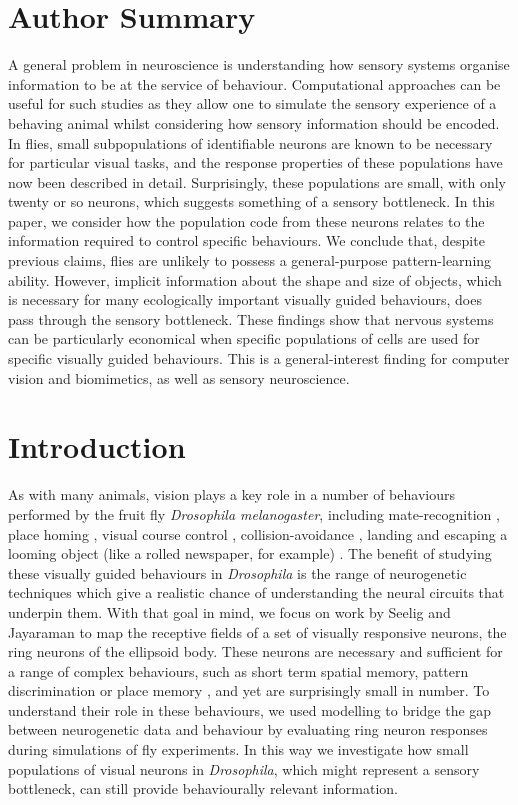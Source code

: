 \section*{Author Summary}
A general problem in neuroscience is understanding how sensory systems organise information to be at the service of behaviour. Computational approaches can be useful for such studies as they allow one to simulate the sensory experience of a behaving animal whilst considering how sensory information should be encoded. In flies, small subpopulations of identifiable neurons are known to be necessary for particular visual tasks, and the response properties of these populations have now been described in detail. Surprisingly, these populations are small, with only twenty or so neurons, which suggests something of a sensory bottleneck. In this paper, we consider how the population code from these neurons relates to the information required to control specific behaviours. We conclude that, despite previous claims, flies are unlikely to possess a general-purpose pattern-learning ability. However, implicit information about the shape and size of objects, which is necessary for many ecologically important visually guided behaviours, does pass through the sensory bottleneck. These findings show that nervous systems can be particularly economical when specific populations of cells are used for specific visually guided behaviours. This is a general-interest finding for computer vision and biomimetics, as well as sensory neuroscience.

\section*{Introduction}
As with many animals, vision plays a key role in a number of behaviours performed by the fruit fly \emph{Drosophila melanogaster}, including mate-recognition \cite{Agrawal2014}, place homing \cite{Ofstad2011}, visual course control \cite{Borst2014}, collision-avoidance \cite{Tammero2002}, landing \cite{Tammero2002} and escaping a looming object (like a rolled newspaper, for example) \cite{Card2008}. The benefit of studying these visually guided behaviours in \emph{Drosophila} is the range of neurogenetic techniques which give a realistic chance of understanding the neural circuits that underpin them. With that goal in mind, we focus on work by Seelig and Jayaraman \cite{Seelig2013} to map the receptive fields of a set of visually responsive neurons, the ring neurons of the ellipsoid body. These neurons are necessary and sufficient for a range of complex behaviours, such as short term spatial memory, pattern discrimination or place memory \cite{Liu2006,Neuser2008,Ofstad2011,Seelig2015}, and yet are surprisingly small in number. To understand their role in these behaviours, we used modelling to bridge the gap between neurogenetic data and behaviour by evaluating ring neuron responses during simulations of fly experiments. In this way we investigate how small populations of visual neurons in \emph{Drosophila}, which might represent a sensory bottleneck, can still provide behaviourally relevant information.

